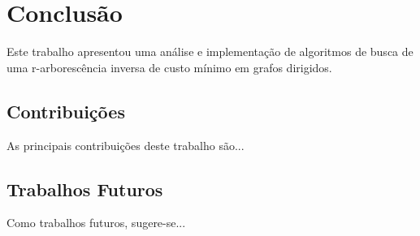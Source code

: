 \chapter{Conclusão}
\label{cap:conclusao}

Este trabalho apresentou uma análise e implementação de algoritmos de busca de uma r-arborescência inversa de custo mínimo em grafos dirigidos.

\section{Contribuições}

As principais contribuições deste trabalho são...

\section{Trabalhos Futuros}

Como trabalhos futuros, sugere-se...
